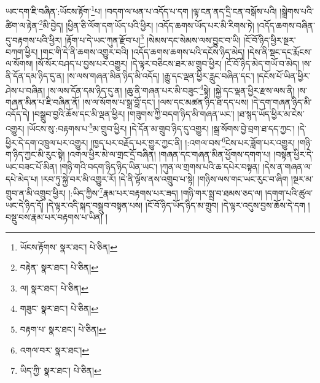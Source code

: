 ཡང་དག་ཇི་བཞིན་:ཡོངས་རྟོག་\footnote{ཡོངས་རྟོགས་  སྣར་ཐང་།  པེ་ཅིན། }པ། །བདག་ལ་ཕན་པ་འདོད་པ་དག །ལྟ་ངན་ནད་དྲི་ངན་བསྒོས་པའི། །སྒྲེགས་པའི་ཚིག་ལ་རྟེན་\footnote{བརྟེན་  སྣར་ཐང་།  པེ་ཅིན། }མི་བྱེད། །ཕྱིན་ཅི་ལོག་དག་ཡོད་པའི་ཕྱིར། །འདོད་ཆགས་ཡོད་པར་མི་རིགས་ཏེ། །འདོད་ཆགས་བཞིན་དུ་བརྟགས་པའི་ཕྱིར། །རྟོག་པ་དེ་ཡང་ཀུན་རྫོབ་པ།\footnote{ལ།  སྣར་ཐང་།  པེ་ཅིན། } །སེམས་དང་སེམས་ལས་བྱུང་བ་ཡི། །ངོ་བོ་ཉིད་ཕྱིར་སྔར་བཀག་ཕྱིར། །གང་གི་དེ་ནི་ཆགས་འགྱུར་བའི། །འདོད་ཆགས་ཆགས་པའི་དངོས་ཉིད་མེད། །དེས་ནི་སྡང་དང་རྨོངས་ལ་སོགས། །སོ་སོར་བཤད་པ་བྱས་པར་འགྱུར། །དེ་ལྟར་བཅིངས་ཐར་མ་གྲུབ་ཕྱིར། །ངོ་བོ་ཉིད་མེད་གཡོ་བ་མེད། །ས་ནི་དོན་དམ་ཉིད་དུ་ན། །ས་ལས་གཞན་མིན་ཉིད་མི་འདོད། །རྒྱུ་དང་ལྡན་ཕྱིར་རླུང་བཞིན་དང་། །དངོས་པོ་ཡིན་ཕྱིར་ཤེས་པ་བཞིན། །ས་ལས་དོན་དམ་ཉིད་དུ་ན། །ཆུ་ནི་གཞན་པར་མི་བཟུང་\footnote{གཟུང་  སྣར་ཐང་།  པེ་ཅིན། }སྟེ། །སྐྱེ་དང་ལྡན་ཕྱིར་རྫས་ལས་ནི། །ས་གཞན་མིན་པ་ཇི་བཞིན་ནོ། །ས་ལ་སོགས་པ་སྒྲ་བློ་དང་། །ལས་དང་མཚན་ཉིད་ཐ་དད་པས། །དེ་དག་གཞན་ཉིད་མི་འདོད་དེ། །བསྒྲུབ་བྱའི་ཆོས་དང་མི་ལྡན་ཕྱིར། །གཟུགས་ཀྱི་བདག་ཉིད་མི་གཞན་ཡང་། །ཐ་སྙད་ཡོད་ཕྱིར་མ་ངེས་འགྱུར། །ཡོངས་སུ་:བརྟགས་པ་\footnote{བརྟག་པ་  སྣར་ཐང་།  པེ་ཅིན། }མ་གྲུབ་ཕྱིར། །དེ་དོན་མ་གྲུབ་ཉིད་དུ་འགྱུར། །སྒྲ་སོགས་བྱེ་བྲག་ཐ་དད་ཀྱང་། །དེ་ཕྱིར་དེ་དག་འཁྲུལ་པར་འགྱུར། །ཁྱད་པར་བརྗོད་པར་གྱུར་ཀྱང་ནི། །:འགལ་བས་\footnote{འགལ་བར་  སྣར་ཐང་། }ངེས་པར་ཟློག་པར་འགྱུར། །གཉི་ག་ཉིད་ཀྱང་མི་རུང་སྟེ། །འགལ་ཕྱིར་མེ་ལ་གྲང་དྲོ་བཞིན། །གཞན་དང་གཞན་མིན་ཕྱོགས་དགག་པ། །བསྟན་ཕྱིར་དེ་ཡང་བཟང་པོ་མིན། །གཉི་གའི་བདག་ཉིད་ཉིད་ཡིན་ཡང་། །ཀུན་ལ་གྲགས་པའི་ཆ་དཔེར་བསྟན། །དེས་ན་གཞན་ལ་དཔེ་མེད་པ། །རབ་ཏུ་སྐྱེ་བར་མི་འགྱུར་རོ། །དེ་ནི་ལྟོས་ནས་འགྲུབ་པ་སྟེ། །གཉིས་ལས་གང་ཡང་རུང་བ་ཞིག །སྔར་མ་གྲུབ་ན་མི་འགྲུབ་ཕྱིར། །:ཡིད་ཀྱིས་\footnote{ཡིད་ཀྱི་  སྣར་ཐང་།  པེ་ཅིན། }རྣམ་པར་བརྟགས་པར་ཟད། །གཉི་གར་སྨྲ་བ་ཐམས་ཅད་ལ། །དགག་པའི་ཚུལ་ཡང་དེ་ཉིད་དོ། །དེ་ལྟར་འདི་སྐད་བསྒྲུབ་བསྟན་པས། །ངོ་བོ་ཉིད་ཡོད་ཉིད་མ་གྲུབ། །དེ་ལྟར་འདུས་བྱས་ཆོས་དེ་དག །བསྡུ་བས་རྣམ་པར་བརྟགས་པ་ཡིན། །
